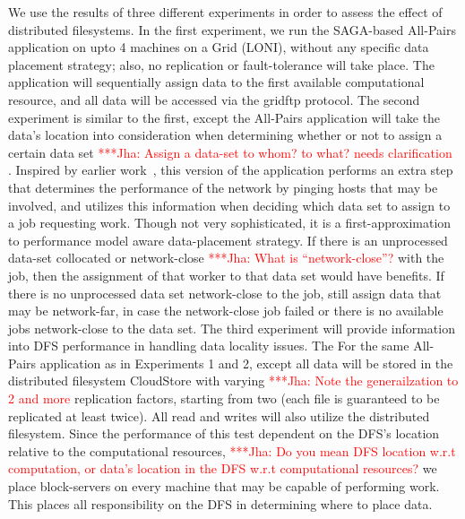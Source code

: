 \documentclass[a4paper,11pt]{article}
\newcommand{\jhanote}[1]{ {\textcolor{red} { ***Jha: #1 }}}
\newcommand{\jhanote}[1]{}
\begin{document}
We use the results of three different experiments in order to assess the effect of distributed filesystems. In the first experiment, we run the SAGA-based All-Pairs application on upto 4 machines on a Grid (LONI), without any specific data placement strategy; also, no replication or fault-tolerance will take place. The application will sequentially assign data to the first available computational resource, and all data will be accessed via the gridftp protocol. The second experiment is similar to the first, except the All-Pairs application will take the data's location into consideration when determining whether or not to assign a certain data set \jhanote{Assign a data-set to whom? to what? needs clarification}. Inspired by earlier work~\cite{netperf}, this version of the application performs an extra step that determines the performance of the network by pinging hosts that may be involved, and utilizes this information when deciding which data set to assign to a job requesting work. Though not very sophisticated, it is a first-approximation to performance model aware data-placement strategy.  If there is an unprocessed data-set collocated or network-close \jhanote{What is ``network-close''?} with the job, then the assignment of that worker to that data set would have benefits. If there is no unprocessed data set network-close to the job, still assign data that may be network-far, in case the network-close job failed or there is no available jobs network-close to the data set. The third experiment will provide information into DFS performance in handling data locality issues. The For the same All-Pairs application as in Experiments 1 and 2, except all data will be stored in the distributed filesystem CloudStore with varying \jhanote{Note the generailzation to 2 and more} replication factors, starting from two (each file is guaranteed to be replicated at least twice). All read and writes will also utilize the distributed filesystem. Since the performance of this test dependent on the DFS's location relative to the computational resources, \jhanote{Do you mean DFS location w.r.t computation, or data's location in the DFS w.r.t computational resources?} we place block-servers on every machine that may be capable of performing work. This places
all responsibility on the DFS in determining where to place data.
\end{document}
